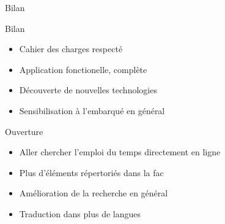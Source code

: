 \documentclass{beamer}
\begin{document}
		\begin{frame}{Bilan}
			\begin{block}{Bilan}
				\begin{itemize}
					\item Cahier des charges respecté
					\item Application fonctionelle, complète
					\item Découverte de nouvelles technologies
					\item Sensibilisation à l'embarqué en général
				\end{itemize}
			\end{block}
			\pause
			\begin{exampleblock}{Ouverture}
				\begin{itemize}
				\item Aller chercher l'emploi du temps directement en ligne
				\item Plus d'éléments répertoriés dans la fac
				\item Amélioration de la recherche en général
				\item Traduction dans plus de langues
				\end{itemize}
			\end{exampleblock}
		\end{frame}
\end{document}
